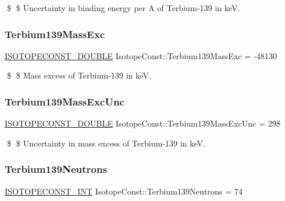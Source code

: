 \$ \$ Uncertainty in binding energy per A of Terbium-\/139 in keV. \mbox{\label{group___isotope_const-_terbium-_tb139_ga65c1e9d5417ad0ddfc3ced12ce211a1d}} 
\subsubsection{\texorpdfstring{Terbium139\+Mass\+Exc}{Terbium139MassExc}}
{\footnotesize\ttfamily \mbox{\hyperlink{group___isotope_const-_macros_ga8f45a7272ce02c0b4c65c44636ed719a}{I\+S\+O\+T\+O\+P\+E\+C\+O\+N\+S\+T\+\_\+\+D\+O\+U\+B\+LE}} Isotope\+Const\+::\+Terbium139\+Mass\+Exc = -\/48130}

\$ \$ Mass excess of Terbium-\/139 in keV. \mbox{\label{group___isotope_const-_terbium-_tb139_ga3e6c35d1d9d1fd177338bd3df994819d}} 
\subsubsection{\texorpdfstring{Terbium139\+Mass\+Exc\+Unc}{Terbium139MassExcUnc}}
{\footnotesize\ttfamily \mbox{\hyperlink{group___isotope_const-_macros_ga8f45a7272ce02c0b4c65c44636ed719a}{I\+S\+O\+T\+O\+P\+E\+C\+O\+N\+S\+T\+\_\+\+D\+O\+U\+B\+LE}} Isotope\+Const\+::\+Terbium139\+Mass\+Exc\+Unc = 298}

\$ \$ Uncertainty in mass excess of Terbium-\/139 in keV. \mbox{\label{group___isotope_const-_terbium-_tb139_ga51de8fb70ca9af4dc95f32034340c250}} 
\subsubsection{\texorpdfstring{Terbium139\+Neutrons}{Terbium139Neutrons}}
{\footnotesize\ttfamily \mbox{\hyperlink{group___isotope_const-_macros_ga5f18360b3e99483a35c32d789e62621c}{I\+S\+O\+T\+O\+P\+E\+C\+O\+N\+S\+T\+\_\+\+I\+NT}} Isotope\+Const\+::\+Terbium139\+Neutrons = 74}

